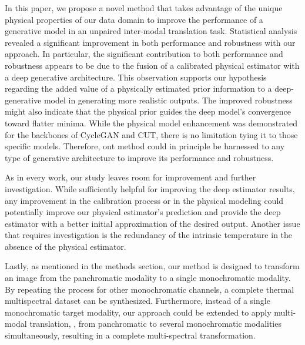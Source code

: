 In this paper, we propose a novel method that takes advantage of the unique physical properties of our data domain to improve the performance of a generative model in an unpaired inter-modal translation task. 
Statistical analysis revealed a significant improvement in both performance and robustness with our approach.
In particular, the significant contribution to both performance and robustness appears to be due to the fusion of a calibrated physical estimator with a deep generative architecture. 
This observation supports our hypothesis regarding the added value of a physically estimated prior information to a deep-generative model in generating more realistic outputs.
The improved robustness might also indicate that the physical prior guides the deep model's convergence toward flatter minima. 
While the physical model enhancement was demonstrated for the backbones of CycleGAN and CUT, there is no limitation tying it to those specific models.
Therefore, out method could in principle be harnessed to any type of generative architecture to improve its performance and robustness.

As in every work, our study leaves room for improvement and further investigation.
While sufficiently helpful for improving the deep estimator results, any improvement in the calibration process or in the physical modeling could potentially improve our physical estimator's prediction and provide the deep estimator with a better initial approximation of the desired output.
Another issue that requires investigation is the redundancy of the intrinsic temperature in the absence of the physical estimator.

Lastly, as mentioned in the methods section, our method is designed to transform an image from the panchromatic modality to a single monochromatic modality.
By repeating the process for other monochromatic channels, a complete thermal multispectral dataset can be synthesized.
Furthermore, instead of a single monochromatic target modality, our approach could be extended to apply multi-modal translation, \ie, from panchromatic to several monochromatic modalities simultaneously, resulting in a complete multi-spectral transformation.